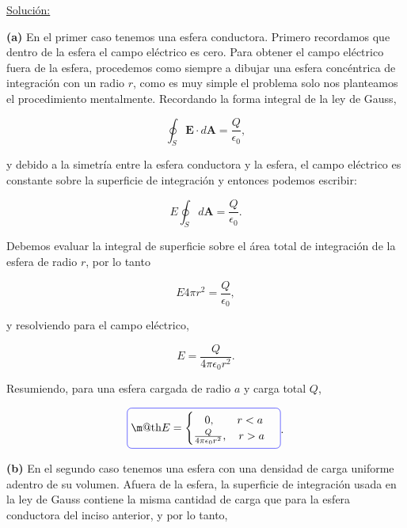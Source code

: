 \documentclass[a4paper,10pt]{article}
\makeatletter
\numberwithin{equation}{section}
\newcommand*{\boxcolor}{blue}
\renewcommand{\boxed}[1]{\textcolor{\boxcolor}{%
\tikz[baseline={([yshift=-1ex]current bounding box.center)}] \node [rectangle, minimum width=1ex,rounded corners,draw] {\normalcolor\m@th$\displaystyle#1$};}}
\makeatother
\begin{document}
\vspace{.3cm}

\underline{Solución:} \vspace{.3cm}

\textbf{(a)} En el primer caso tenemos una esfera conductora. Primero recordamos que 
dentro de la esfera el campo eléctrico es cero. Para obtener el campo eléctrico 
fuera de la esfera, procedemos como siempre a dibujar una esfera concéntrica de 
integración con un radio $r$, como es muy simple el problema solo nos planteamos 
el procedimiento mentalmente. Recordando la forma integral de la ley de Gauss,

\begin{equation}
 \oint_S \mathbf{E} \cdot d\mathbf{A} = \frac{Q}{\epsilon_0},
\end{equation}

y debido a la simetría entre la esfera conductora y la esfera, el campo eléctrico es 
constante sobre la superficie de integración y entonces podemos escribir:

\begin{equation}
  E \oint_S  d\mathbf{A} = \frac{Q}{\epsilon_0}.
\end{equation}

Debemos evaluar la integral de superficie sobre el área total de integración 
de la esfera de radio $r$, por lo tanto 

\begin{equation}
 E4\pi r^2 = \frac{Q}{\epsilon_0},
\end{equation}

y resolviendo para el campo eléctrico, 

\begin{equation}
 E = \frac{Q}{4\pi \epsilon_0 r^2}.
\end{equation}

Resumiendo, para una esfera cargada de radio $a$ y carga total $Q$,

\begin{equation}
\boxed{
  E =\begin{cases}
	      \quad 0, \quad  \quad r < a \\
	      \frac{Q}{4\pi \epsilon_0 r^2}, \quad r > a
	       \end{cases}}.
\end{equation}

\textbf{(b)} En el segundo caso tenemos una esfera con una densidad de carga 
uniforme adentro de su volumen. Afuera de la esfera, la superficie de integración usada en la ley 
de Gauss contiene la misma cantidad de carga que para la esfera conductora 
del inciso anterior, y por lo tanto,
\end{document}
